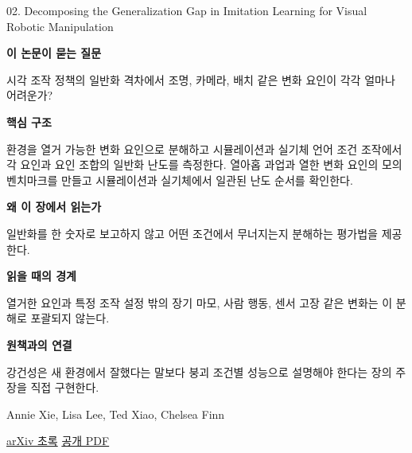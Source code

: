 \documentclass[11pt,openany]{book}
\begin{document}
\begin{termcard}{02. Decomposing the Generalization Gap in Imitation Learning for Visual Robotic Manipulation}

\par

\medskip

{\sffamily\bfseries\color{deepblue} 이 논문이 묻는 질문}\par

시각 조작 정책의 일반화 격차에서 조명, 카메라, 배치 같은 변화 요인이 각각 얼마나 어려운가?

\smallskip

{\sffamily\bfseries\color{deepblue} 핵심 구조}\par

환경을 열거 가능한 변화 요인으로 분해하고 시뮬레이션과 실기체 언어 조건 조작에서 각 요인과 요인 조합의 일반화 난도를 측정한다. 열아홉 과업과 열한 변화 요인의 모의 벤치마크를 만들고 시뮬레이션과 실기체에서 일관된 난도 순서를 확인한다.

\smallskip

{\sffamily\bfseries\color{deepblue} 왜 이 장에서 읽는가}\par

일반화를 한 숫자로 보고하지 않고 어떤 조건에서 무너지는지 분해하는 평가법을 제공한다.

\smallskip

{\sffamily\bfseries\color{coral} 읽을 때의 경계}\par

열거한 요인과 특정 조작 설정 밖의 장기 마모, 사람 행동, 센서 고장 같은 변화는 이 분해로 포괄되지 않는다.

\smallskip

{\sffamily\bfseries\color{teal} 원책과의 연결}\par

강건성은 새 환경에서 잘했다는 말보다 붕괴 조건별 성능으로 설명해야 한다는 장의 주장을 직접 구현한다.

\medskip

{\footnotesize\color{muted} Annie Xie, Lisa Lee, Ted Xiao, Chelsea Finn\par

\href{https://arxiv.org/abs/2307.03659}{arXiv 초록} \quad \href{https://arxiv.org/pdf/2307.03659}{공개 PDF}\par}

\end{termcard}
\end{document}

